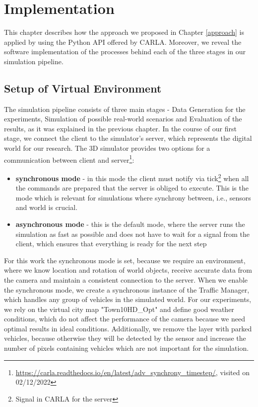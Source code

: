 \chapter{Implementation} \label{implementation}
This chapter describes how the approach we proposed in Chapter \ref{approach} is applied by using the Python API offered by CARLA. Moreover, we reveal the software implementation of the processes behind each of the three stages in our simulation pipeline.  

\section{Setup of Virtual Environment}
The simulation pipeline consists of three main stages - Data Generation for the experiments, Simulation of possible real-world scenarios and Evaluation of the results, as it was explained in the previous chapter. In the course of our first stage, we connect the client to the simulator's server, which represents the digital world for our research. The 3D simulator provides two options for a communication between client and server\footnote{\url{https://carla.readthedocs.io/en/latest/adv_synchrony_timestep/}, visited on 02/12/2022}:
\begin{itemize}
    \item \textbf{synchronous mode} - in this mode the client must notify via tick\footnote{Signal in CARLA for the server} when all the commands are prepared that the server is obliged to execute. This is the mode which is relevant for simulations where synchrony between, i.e., sensors and world is crucial. 
    \item \textbf{asynchronous mode} - this is the default mode, where the server runs the simulation as fast as possible and does not have to wait for a signal from the client, which ensures that everything is ready for the next step 
\end{itemize}

For this work the synchronous mode is set, because we require an environment, where we know location and rotation of world objects, receive accurate data from the camera and maintain a consistent connection to the server. When we enable the synchronous mode, we create a synchronous instance of the Traffic Manager, which handles any group of vehicles in the simulated world. For our experiments, we rely on the virtual city map "Town10HD\_Opt" and define good weather conditions, which do not affect the performance of the camera because we need optimal results in ideal conditions. Additionally, we remove the layer with parked vehicles, because otherwise they will be detected by the sensor and increase the number of pixels containing vehicles which are not important for the simulation.

